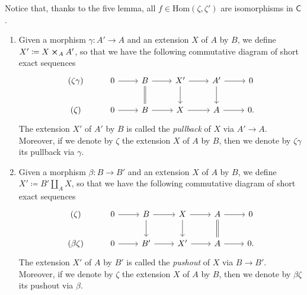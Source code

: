 \documentclass[../Main]{subfiles}
\begin{document}
\begin{rem}[]
	Notice that, thanks to the five lemma, all $f \in \mathrm{Hom} 
	\left( \zeta, \zeta' \right)$ are isomorphisms in $\mathsf{C}$.
\end{rem}


\begin{defn}\leavevmode\vspace{-\baselineskip}
\begin{enumerate}
	\item Given a morphism $\gamma\colon A' \to A$ and an extension $X$
		of $A$ by $B$, we define $X' \coloneqq X \cross_A A'$,
		so that we have the following commutative diagram
		of short exact sequences
		\begin{equation*}
		\begin{tikzcd}
			(\zeta\gamma) &
			0 \arrow[r, "", rightarrow] &
			B \arrow[r, "", rightarrow] 
			\arrow[d, "", equals] &
			X' \arrow[r, "", rightarrow] 
			\arrow[d, "", rightarrow] &
			A' \arrow[r, "", rightarrow] 
			\arrow[d, "", rightarrow] &
			0\\
			(\zeta) &
			0 \arrow[r, "", rightarrow] &
			B \arrow[r, "", rightarrow] &
			X \arrow[r, "", rightarrow] &
			A \arrow[r, "", rightarrow] &
			0
		.\end{tikzcd}
		\end{equation*}
		The extension $X'$ of $A'$ by $B$
		is called the {\em pullback} of $X$ via $A' \to A$.
		Moreover, if we denote by $\zeta$ the extension
		$X$ of $A$ by $B$, then we denote by $\zeta\gamma$
		its pullback via $\gamma$.

	\item Given a morphism $\beta\colon B \to B'$ and an extension $X$
		of $A$ by $B$, we define $X' \coloneqq B' \amalg_A X$,
		so that we have the following commutative diagram
		of short exact sequences
		\begin{equation*}
		\begin{tikzcd}
			(\zeta) &
			0 \arrow[r, "", rightarrow] &
			B \arrow[r, "", rightarrow] 
			\arrow[d, "", rightarrow] &
			X \arrow[r, "", rightarrow] 
			\arrow[d, "", rightarrow] &
			A \arrow[r, "", rightarrow] 
			\arrow[d, "", equals] &
			0\\
			(\beta\zeta) &
			0 \arrow[r, "", rightarrow] &
			B' \arrow[r, "", rightarrow] &
			X' \arrow[r, "", rightarrow] &
			A \arrow[r, "", rightarrow] &
			0
		.\end{tikzcd}
		\end{equation*}
		The extension $X'$ of $A$ by $B'$
		is called the {\em pushout} of $X$ via $B \to B'$.
		Moreover, if we denote by $\zeta$ the extension
		$X$ of $A$ by $B$, then we denote by $\beta\zeta$
		its pushout via $\beta$.
\end{enumerate}
\end{defn}
\end{document}
